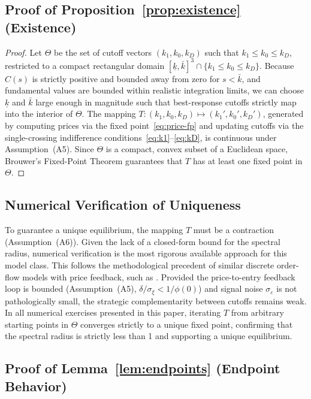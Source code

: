 \documentclass[11pt]{article}
\newcommand{\1}{\mathbf{1}}
\begin{document}
\subsection{Proof of Proposition~\ref{prop:existence} (Existence)}
\label{app:proof-existence}

\begin{proof}
Let $\Theta$ be the set of cutoff vectors $(k_1,k_0,k_D)$ such that $k_1\le k_0\le k_D$, restricted to a compact rectangular domain $[\underline{k},\bar{k}]^3\cap\{k_1\le k_0\le k_D\}$. Because $C(s)$ is strictly positive and bounded away from zero for $s<\bar{k}$, and fundamental values are bounded within realistic integration limits, we can choose $\underline{k}$ and $\bar{k}$ large enough in magnitude such that best-response cutoffs strictly map into the interior of $\Theta$. The mapping $T:(k_1,k_0,k_D)\mapsto (k_1',k_0',k_D')$, generated by computing prices via the fixed point~\eqref{eq:price-fp} and updating cutoffs via the single-crossing indifference conditions~\eqref{eq:k1}--\eqref{eq:kD}, is continuous under Assumption~\textup{(A5)}. Since $\Theta$ is a compact, convex subset of a Euclidean space, Brouwer's Fixed-Point Theorem guarantees that $T$ has at least one fixed point in $\Theta$.
\end{proof}

\subsection{Numerical Verification of Uniqueness}
\label{app:proof-uniqueness}

To guarantee a unique equilibrium, the mapping $T$ must be a contraction (Assumption~\textup{(A6)}). Given the lack of a closed-form bound for the spectral radius, numerical verification is the most rigorous available approach for this model class. This follows the methodological precedent of similar discrete order-flow models with price feedback, such as \citet{EdmansGoldsteinJiang2015}. Provided the price-to-entry feedback loop is bounded (Assumption~\textup{(A5)}, $\delta/\sigma_\xi < 1/\phi(0)$) and signal noise $\sigma_\varepsilon$ is not pathologically small, the strategic complementarity between cutoffs remains weak. In all numerical exercises presented in this paper, iterating $T$ from arbitrary starting points in $\Theta$ converges strictly to a unique fixed point, confirming that the spectral radius is strictly less than 1 and supporting a unique equilibrium.

\subsection{Proof of Lemma~\ref{lem:endpoints} (Endpoint Behavior)}
\label{app:proof-endpoints}
\end{document}
